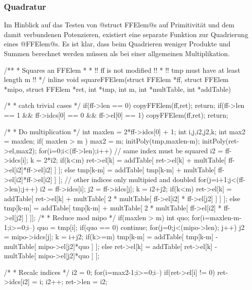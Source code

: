 \subsubsection{Quadratur}
Im Hinblick auf das Testen von @struct FFElem@s auf Primitivität und dem damit
verbundenen Potenzieren, existiert eine separate Funktion zur Quadrierung eines 
@FFElem@s. Es ist klar, dass beim Quadrieren weniger Produkte und Summen
berechnet werden müssen als bei einer allgemeinen Multiplikation.
\begin{ccode}[caption={Aus \url{../Sage/enumeratePCNs.c}},
  firstnumber=404]
/**
 * Squares an FFElem
 *
 * !! ff is not modified !!
 * !! tmp must have at least length m !!
 */
inline void squareFFElem(struct FFElem *ff, struct FFElem *mipo,
        struct FFElem *ret, int *tmp, int m,
        int *multTable, int *addTable){
    /* 
     * catch trivial cases
     */
    if(ff->len == 0){
        copyFFElem(ff,ret);
        return;
    }
    if(ff->len == 1 && ff->idcs[0] == 0 && ff->el[0] == 1){
        copyFFElem(ff,ret);
        return;
    }

    /*
     * Do multiplication
     */
    int maxlen = 2*ff->idcs[0] + 1;
    int i,j,i2,j2,k;
    int max2 = maxlen;
    if( maxlen > m ){
        max2 = m;
        initPoly(tmp,maxlen-m);
    }
    initPoly(ret->el,max2);
    for(i=0;i<(ff->len);i++){
        // same index must be squared
        i2 = ff->idcs[i];
        k = 2*i2;
        if(k<m){
            ret->el[k] = addTable[ ret->el[k] + 
                multTable[ ff->el[i2]*ff->el[i2] ] ];
        }else{
            tmp[k-m] = addTable[ tmp[k-m] +
                multTable[ ff->el[i2]*ff->el[i2] ] ];
        }
        // other indices only multipied and doubled
        for(j=i+1;j<(ff->len);j++){
            i2 = ff->idcs[i];
            j2 = ff->idcs[j];
            k = i2+j2;
            if(k<m){
                ret->el[k] = addTable[ ret->el[k] + 
                    multTable[ 2 * multTable[ ff->el[i2] * ff->el[j2] ] ] ];
            }else{
                tmp[k-m] = addTable[ tmp[k-m] +
                    multTable[ 2 * multTable[ ff->el[i2] * ff->el[j2] ] ]];
            }
        }
    }
    /*
     * Reduce mod mipo
     */
    if(maxlen > m){
        int quo;
        for(i=maxlen-m-1;i>=0;i--){
            quo = tmp[i];
            if(quo == 0) continue;
            for(j=0;j<(mipo->len); j++){
                j2 = mipo->idcs[j];
                k = i+j2;
                if(k>=m){
                    tmp[k-m] = addTable[ tmp[k-m] - 
                        multTable[ mipo->el[j2]*quo ] ];
                }else{
                    ret->el[k] = addTable[ ret->el[k] - 
                        multTable[ mipo->el[j2]*quo ] ];
                }
            }
        }
    }

    /*
     * Recalc indices
     */
    i2 = 0;
    for(i=max2-1;i>=0;i--){
        if(ret->el[i] != 0){
            ret->idcs[i2] = i;
            i2++;
        }
    }
    ret->len = i2;
}
\end{ccode}


